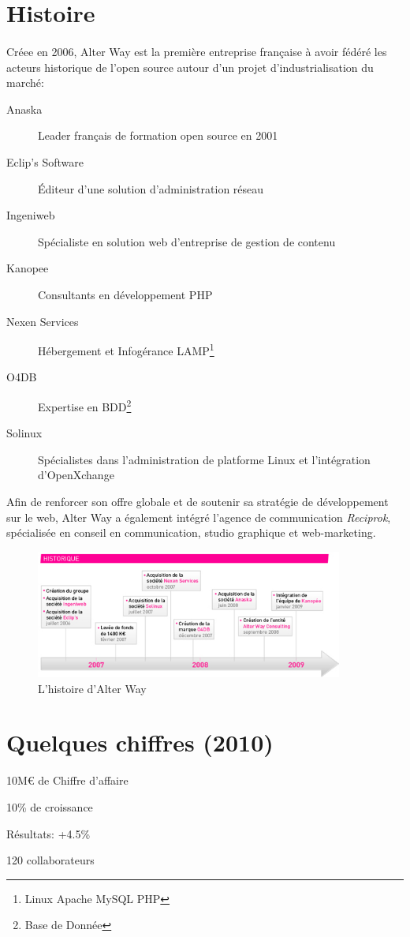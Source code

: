 \section{Histoire}
\paragraph*{}
	Créee en 2006, Alter Way est la première entreprise française à avoir fédéré les acteurs historique
	de l'open source autour d'un projet d'industrialisation du marché:

	\begin{description}
		\item[Anaska] Leader français de formation open source en 2001
		\item[Eclip's Software] Éditeur d'une solution d'administration réseau
		\item[Ingeniweb] Spécialiste en solution web d'entreprise de gestion de contenu
		\item[Kanopee] Consultants en développement PHP
		\item[Nexen Services] Hébergement et Infogérance LAMP\footnote{Linux Apache MySQL PHP}
		\item[O4DB] Expertise en BDD\footnote{Base de Donnée}
		\item[Solinux] Spécialistes dans l'administration de platforme Linux et l'intégration d'OpenXchange
	\end{description}

	Afin de renforcer son offre globale et de soutenir sa stratégie de développement sur le web, Alter Way
	a également intégré l'agence de communication \emph{Reciprok}, spécialisée en conseil en communication,
	studio graphique et web-marketing.

	\begin{figure}
		\centering
		\includegraphics[width=0.9\textwidth]{resource/img/historique_aw}
		\caption{L'histoire d'Alter Way}
	\end{figure}

\section{Quelques chiffres (2010)}
 \begin{listi}
		\item 10M\euro{} de Chiffre d'affaire
		\item 10\% de croissance
		\item Résultats: +4.5\%
		\item 120 collaborateurs
 \end{listi}

